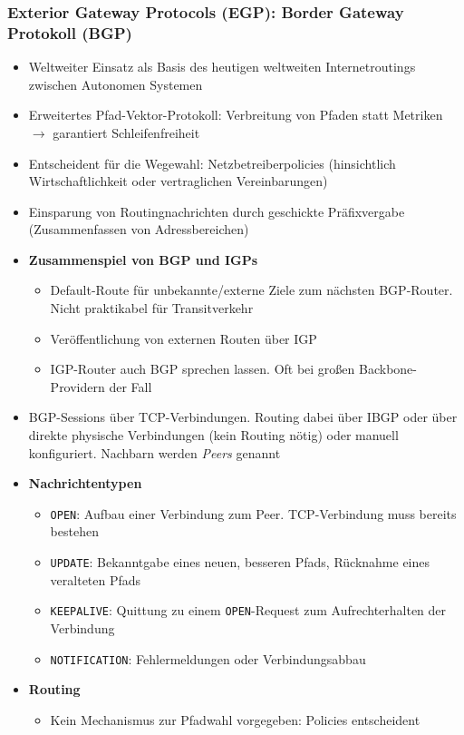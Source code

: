 \subsubsection{Exterior Gateway Protocols (EGP): Border Gateway Protokoll (BGP)}
\begin{itemize}
	\item Weltweiter Einsatz als Basis des heutigen weltweiten Internetroutings zwischen Autonomen Systemen
	\item Erweitertes Pfad-Vektor-Protokoll: Verbreitung von Pfaden statt Metriken \(\rightarrow\) garantiert Schleifenfreiheit
	\item Entscheident für die Wegewahl: Netzbetreiberpolicies (hinsichtlich Wirtschaftlichkeit oder vertraglichen Vereinbarungen)
	\item Einsparung von Routingnachrichten durch geschickte Präfixvergabe (Zusammenfassen von Adressbereichen)
	\item \textbf{Zusammenspiel von BGP und IGPs}
	\begin{itemize}
		\item Default-Route für unbekannte/externe Ziele zum nächsten BGP-Router. Nicht praktikabel für Transitverkehr
		\item Veröffentlichung von externen Routen über IGP
		\item IGP-Router auch BGP sprechen lassen. Oft bei großen Backbone-Providern der Fall
	\end{itemize}
	\item BGP-Sessions über TCP-Verbindungen. Routing dabei über IBGP oder über direkte physische Verbindungen (kein Routing nötig) oder manuell konfiguriert. Nachbarn werden \textit{Peers} genannt
	\item \textbf{Nachrichtentypen}
	\begin{itemize}
		\item \texttt{OPEN}: Aufbau einer Verbindung zum Peer. TCP-Verbindung muss bereits bestehen
		\item \texttt{UPDATE}: Bekanntgabe eines neuen, besseren Pfads, Rücknahme eines veralteten Pfads
		\item \texttt{KEEPALIVE}: Quittung zu einem \texttt{OPEN}-Request zum Aufrechterhalten der Verbindung
		\item \texttt{NOTIFICATION}: Fehlermeldungen oder Verbindungsabbau
	\end{itemize}
	\item \textbf{Routing}
	\begin{itemize}
		\item Kein Mechanismus zur Pfadwahl vorgegeben: Policies entscheident

\end{itemize}
\end{itemize}

